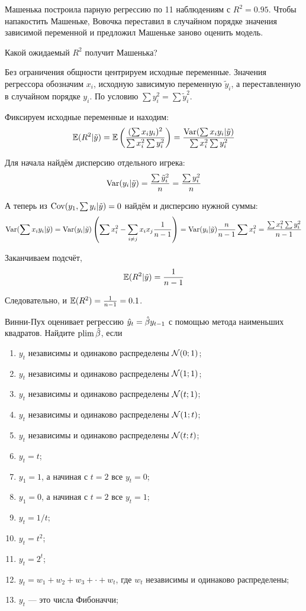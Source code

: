 \begin{problem}
Машенька построила парную регрессию по 11 наблюдениям с $R^2=0.95$. Чтобы напакостить Машеньке, Вовочка переставил в случайном порядке значения зависимой переменной и предложил Машеньке заново оценить модель.

Какой ожидаемый $R^2$ получит Машенька?
\begin{sol}
Без ограничения общности центрируем исходные переменные. Значения регрессора обозначим $x_i$, исходную зависимую переменную $\tilde{y}_i$, а переставленную в случайном порядке $y_i$. По условию $\sum y_i^2 = \sum \tilde{y}_i^2$.

Фиксируем исходные переменные и находим:
\[
\mathbb{E}(R^2 | \tilde{y}) = \mathbb{E}\left( \frac{(\sum x_i y_i )^2}{\sum x_i^2 \sum y_i^2}  \right) = \frac{\operatorname{Var}(\sum x_i y_i | \tilde{y})}{\sum x_i^2 \sum y_i^2}
\]

Для начала найдём дисперсию отдельного игрека:
\[
\operatorname{Var}(y_i | \tilde{y}) = \frac{\sum \tilde{y}_i^2}{n} = \frac{\sum y_i^2}{n}
\]

А теперь из $\operatorname{Cov}(y_1, \sum y_i | \tilde{y}) =0$ найдём и дисперсию нужной суммы:
\[
\operatorname{Var}(\sum x_i y_i | \tilde{y}) = \operatorname{Var}(y_i | \tilde{y}) \left(  \sum x_i^2 - \sum_{i\neq j} x_i x_j \frac{1}{n-1}  \right) = \operatorname{Var}(y_i | \tilde{y}) \frac{n}{n-1} \sum x_i^2 = \frac{\sum x_i^2 \sum y_i^2 }{n-1}
\]

Заканчиваем подсчёт,
\[
\mathbb{E}(R^2 | \tilde{y}) = \frac{1}{n-1}
\]

Следовательно, и $\mathbb{E}(R^2) = \frac{1}{n-1} = 0.1$.
\end{sol}
\end{problem}

\begin{problem}
	Винни-Пух оценивает регрессию $\hat{y}_t = \hat{\beta} y_{t-1}$ с помощью метода наименьших квадратов.
	Найдите $\operatorname*{plim} \hat{\beta}$, если
\begin{enumerate}
	\item $y_t$ независимы и одинаково распределены $\mathcal{N}(0; 1)$;
	\item $y_t$ независимы и одинаково распределены $\mathcal{N}(1; 1)$;
	\item $y_t$ независимы и одинаково распределены $\mathcal{N}(t; 1)$;
	\item $y_t$ независимы и одинаково распределены $\mathcal{N}(1; t)$;
	\item $y_t$ независимы и одинаково распределены $\mathcal{N}(t; t)$;
	\item $y_t = t$;
	\item $y_1 = 1$, а начиная с $t=2$ все $y_t=0$;
	\item $y_1 = 0$, а начиная с $t=2$ все $y_t=1$;
	\item $y_t = 1/t$;
	\item $y_t = t^2$;
	\item $y_t= 2^t$;
	\item $y_t = w_1 + w_2 + w_3 + \cdot + w_t$, где $w_t$ независимы и одинаково распределены;
	\item $y_t$ — это числа Фибоначчи;
\end{enumerate}

\begin{sol}
\end{sol}
\end{problem}


